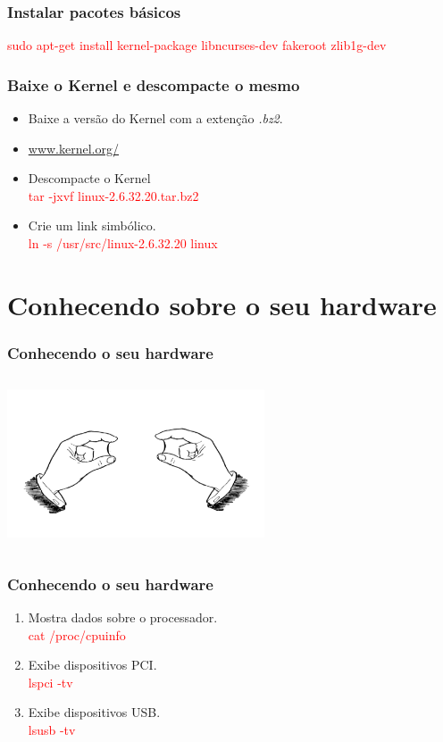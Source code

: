 \documentclass{beamer}
\begin{document}
\begin{frame}
  \frametitle{Instalar pacotes básicos}
    \textcolor{red}{
    sudo apt-get install kernel-package libncurses-dev fakeroot zlib1g-dev}

\end{frame}

\begin{frame}
  \frametitle{Baixe o Kernel e descompacte o mesmo}

   \begin{itemize}
    \item Baixe a versão do Kernel com a extenção \textit{.bz2}.
    \pause
    \item \url{www.kernel.org/}
    \pause
    \item Descompacte o Kernel\\
      \textcolor{red}{tar -jxvf linux-2.6.32.20.tar.bz2}
    \pause
    \item Crie um link simbólico.\\
      \textcolor{red}{ln -s /usr/src/linux-2.6.32.20 linux}
   \end{itemize}
\end{frame}

\section{Conhecendo sobre o seu hardware}

\begin{frame}
 \frametitle{Conhecendo o seu hardware}
 \begin{center}
  \includegraphics[height = 2in, width = 3in]{images/parenthesis.jpg}
 \end{center}

\end{frame}

\begin{frame}
  \frametitle{Conhecendo o seu hardware}
 \begin{enumerate}
  \item Mostra dados sobre o processador.\\
    \textcolor{red}{cat /proc/cpuinfo}
    \pause
  \item Exibe dispositivos PCI. \\
    \textcolor{red}{lspci -tv}
    \pause
  \item Exibe dispositivos USB. \\
    \textcolor{red}{lsusb -tv}
 \end{enumerate}

\end{frame}
\end{document}
